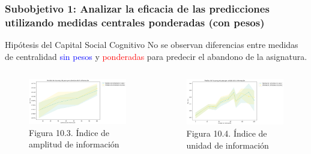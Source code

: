 \documentclass{beamer}
\begin{document}
\begin{frame}
\begin{columns}[c]
\begin{column}{.5\textwidth}
\begin{figure}
			\end{figure}
		\end{column}
	\end{columns}
	
\end{frame}


\begin{frame}
	\frametitle{Subobjetivo 1: Analizar la eficacia de las predicciones utilizando medidas centrales ponderadas (con pesos)}
\begin{block}{Hipótesis del Capital Social Cognitivo}
No se observan diferencias entre medidas de centralidad \textcolor{blue}{sin pesos} y  \textcolor{red}{ponderadas} para predecir el abandono de la asignatura.
\end{block}

		\begin{columns}[c]
		\begin{column}{.5\textwidth}
			\begin{figure}
				\centering
				\includegraphics[width=1\textwidth]{figs/cap7/figura_34}
				\caption{Figura 10.3. Índice de amplitud de información}
			\end{figure}      
		\end{column}
		\begin{column}{.5\textwidth}
			\begin{figure}
				\centering
			\includegraphics[width=1\textwidth]{figs/cap7/figura_35}
				\caption{Figura 10.4. Índice de unidad de información}
			\end{figure}
		\end{column}
		\end{columns}
			
\end{frame}
\end{document}
